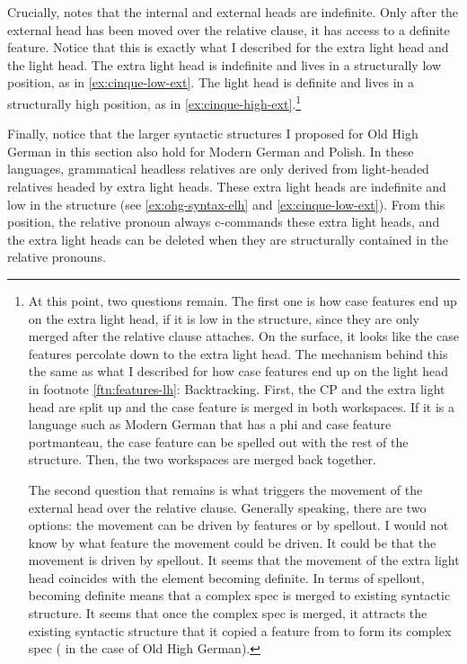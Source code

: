 Crucially, \citet{cinqueforthcoming} notes that the internal and external heads are indefinite. Only after the external head has been moved over the relative clause, it has access to a definite feature. Notice that this is exactly what I described for the extra light head and the light head. The extra light head is indefinite and lives in a structurally low position, as in \ref{ex:cinque-low-ext}. The light head is definite and lives in a structurally high position, as in \ref{ex:cinque-high-ext}.\footnote{
At this point, two questions remain. The first one is how case features end up on the extra light head, if it is low in the structure, since they are only merged after the relative clause attaches. On the surface, it looks like the case features percolate down to the extra light head. The mechanism behind this the same as what I described for how case features end up on the light head in footnote \ref{ftn:features-lh}: Backtracking. First, the CP and the extra light head are split up and the case feature is merged in both workspaces. If it is a language such as Modern German that has a phi and case feature portmanteau, the case feature can be spelled out with the rest of the structure. Then, the two workspaces are merged back together.

The second question that remains is what triggers the movement of the external head over the relative clause. Generally speaking, there are two options: the movement can be driven by features or by spellout. I would not know by what feature the movement could be driven. It could be that the movement is driven by spellout. It seems that the movement of the extra light head coincides with the element becoming definite. In terms of spellout, becoming definite means that a complex spec is merged to existing syntactic structure. It seems that once the complex spec is merged, it attracts the existing syntactic structure that it copied a feature from to form its complex spec ( in the case of Old High German).
}

Finally, notice that the larger syntactic structures I proposed for Old High German in this section also hold for Modern German and Polish. In these languages, grammatical headless relatives are only derived from light-headed relatives headed by extra light heads. These extra light heads are indefinite and low in the structure (see \ref{ex:ohg-syntax-elh} and \ref{ex:cinque-low-ext}). From this position, the relative pronoun always c-commands these extra light heads, and the extra light heads can be deleted when they are structurally contained in the relative pronouns.

